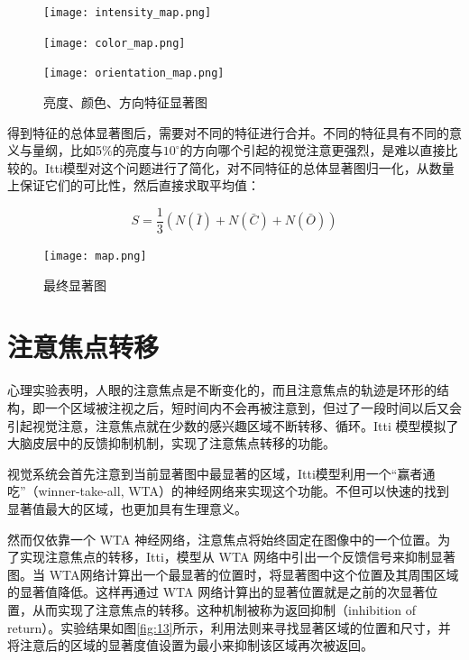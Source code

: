 \documentclass[a4paper,12pt]{article}
\begin{document}
\begin{figure}[!ht]
\begin{minipage}[c]{0.31\textwidth}
\centering
\texttt{[image: intensity\_map.png]}
\end{minipage}
\hspace{1ex}
\begin{minipage}[c]{0.31\textwidth}
\centering
\texttt{[image: color\_map.png]}
\end{minipage}
\hspace{1ex}
\begin{minipage}[c]{0.31\textwidth}
\centering
\texttt{[image: orientation\_map.png]}
\end{minipage}
\caption{亮度、颜色、方向特征显著图}\label{fig:11}
\end{figure} 


得到特征的总体显著图后，需要对不同的特征进行合并。不同的特征具有不同的意义与量纲，比如5\%的亮度与$10^\circ$的方向哪个引起的视觉注意更强烈，是难以直接比较的。Itti模型对这个问题进行了简化，对不同特征的总体显著图归一化，从数量上保证它们的可比性，然后直接求取平均值：

\begin{equation}
S=\frac{1}{3}(N(\bar{I})+N(\bar{C})+N(\bar{O}))
\end{equation}

\begin{figure}[!htb]
\centering
\texttt{[image: map.png]}
\caption{最终显著图}
\label{fig:12} 
\end{figure}





\section{注意焦点转移}

心理实验表明，人眼的注意焦点是不断变化的，而且注意焦点的轨迹是环形的结构，即一个区域被注视之后，短时间内不会再被注意到，但过了一段时间以后又会引起视觉注意，注意焦点就在少数的感兴趣区域不断转移、循环。Itti 模型模拟了大脑皮层中的反馈抑制机制，实现了注意焦点转移的功能。


视觉系统会首先注意到当前显著图中最显著的区域，Itti模型利用一个“赢者通吃”（winner-take-all, WTA）的神经网络来实现这个功能。不但可以快速的找到显著值最大的区域，也更加具有生理意义。


然而仅依靠一个 WTA 神经网络，注意焦点将始终固定在图像中的一个位置。为了实现注意焦点的转移，Itti，模型从 WTA 网络中引出一个反馈信号来抑制显著图。当 WTA网络计算出一个最显著的位置时，将显著图中这个位置及其周围区域的显著值降低。这样再通过 WTA 网络计算出的显著位置就是之前的次显著位置，从而实现了注意焦点的转移。这种机制被称为返回抑制（inhibition of return）。实验结果如图\ref{fig:13}所示，利用法则来寻找显著区域的位置和尺寸，并将注意后的区域的显著度值设置为最小来抑制该区域再次被返回。
\end{document}

